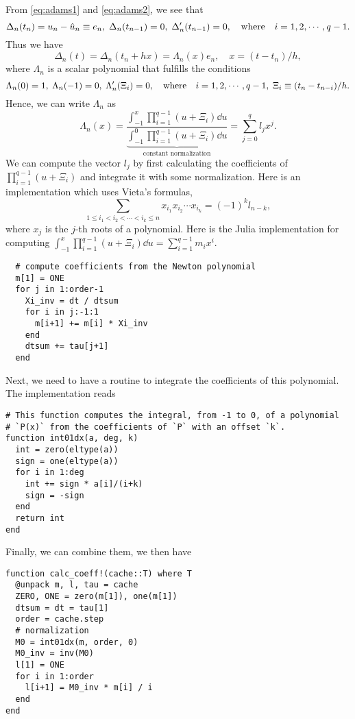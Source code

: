 \documentclass[11pt,a4paper]{article}
\begin{document}
From \cref{eq:adams1} and \cref{eq:adams2}, we see that
\begin{equation}
  \Delta_n(t_n) = u_n - \hat{u}_n \equiv e_n,\; \Delta_n(t_{n-1}) = 0,\;
  \Delta'_n(t_{n-1}) = 0, \qq{where} i=1,2,\cdots,q-1.
\end{equation}
Thus we have
\begin{equation}
  \Delta_n(t) = \Delta_n(t_n+hx) = \Lambda_n(x)e_n, \quad x = (t-t_n)/h,
\end{equation}
where $\Lambda_n$ is a scalar polynomial that fulfills the conditions
\begin{equation}
  \Lambda_n(0)=1,\; \Lambda_n(-1) = 0,\; \Lambda'_n(\Xi_i) = 0,\qq{where}
  i=1,2,\cdots,q-1,\; \Xi_i \equiv (t_n-t_{n-i})/h.
\end{equation}
Hence, we can write $\Lambda_n$ as
\begin{equation}
  \Lambda_n(x) = \frac{\int_{-1}^x\prod_{i=1}^{q-1} (u+\Xi_i) \dd{u}}
          {\underbrace{\int_{-1}^0\prod_{i=1}^{q-1} (u+\Xi_i)
          \dd{u}}_\text{constant normalization}}
               = \sum_{j=0}^{q} l_jx^j.
\end{equation}
We can compute the vector $l_j$ by first calculating the coefficients of
$\prod_{i=1}^{q-1} (u+\Xi_i)$ and integrate it with some normalization. Here is
an implementation which uses Vieta's formulas,
\begin{equation}
  \sum_{1\leq i_{1}<i_{2}<\cdots <i_{k}\leq n}x_{i_{1}}x_{i_{2}}\cdots
  x_{i_{k}}=(-1)^{k}l_{n-k},
\end{equation}
where $x_j$ is the $j$-th roots of a polynomial. Here is the Julia
implementation for computing $\int_{-1}^x\prod_{i=1}^{q-1} (u+\Xi_i) \dd{u} =
\sum_{i=1}^{q-1} m_ix^i$.
\begin{lstlisting}
  # compute coefficients from the Newton polynomial
  m[1] = ONE
  for j in 1:order-1
    Xi_inv = dt / dtsum
    for i in j:-1:1
      m[i+1] += m[i] * Xi_inv
    end
    dtsum += tau[j+1]
  end
\end{lstlisting}
Next, we need to have a routine to integrate the coefficients of this
polynomial. The implementation reads
\begin{lstlisting}
# This function computes the integral, from -1 to 0, of a polynomial
# `P(x)` from the coefficients of `P` with an offset `k`.
function int01dx(a, deg, k)
  int = zero(eltype(a))
  sign = one(eltype(a))
  for i in 1:deg
    int += sign * a[i]/(i+k)
    sign = -sign
  end
  return int
end
\end{lstlisting}
Finally, we can combine them, we then have
\begin{lstlisting}
function calc_coeff!(cache::T) where T
  @unpack m, l, tau = cache
  ZERO, ONE = zero(m[1]), one(m[1])
  dtsum = dt = tau[1]
  order = cache.step
  # normalization
  M0 = int01dx(m, order, 0)
  M0_inv = inv(M0)
  l[1] = ONE
  for i in 1:order
    l[i+1] = M0_inv * m[i] / i
  end
end
\end{lstlisting}
\end{document}
